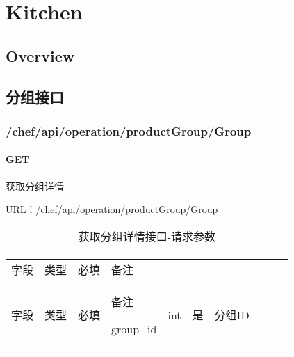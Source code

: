 \part{Kitchen}

\chapter{Overview}


\chapter{分组接口}


\section{/chef/api/operation/productGroup/Group}


\subsection{GET}

获取分组详情

URL：\url{/chef/api/operation/productGroup/Group}





\begin{longtable}{|m{50pt}|m{40pt}|m{50pt}|m{50pt}|}
\tabularnewline\hline
字段&类型&必填&备注
\endhead

\caption{获取分组详情接口-请求参数}\\
\hline
字段&类型&必填&备注
\endfirsthead

\endfoot

\endlastfoot
\hline
group\_id&int&是&分组ID\\
\hline
\end{longtable}


